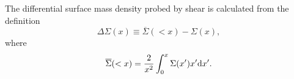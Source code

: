 \documentclass{emulateapj}
\newcommand{\attn}[2][red]{\textcolor{#1}{\textit{#2}}}
\begin{document}
The differential surface mass density probed by shear is calculated from the definition
\begin{equation}\label{dsigma}
\Delta\Sigma(x) \equiv  \overline{\Sigma}(<x) - \Sigma(x),
\end{equation}
where
\begin{equation}\label{sigbar}
\overline{\Sigma}(<x) = \frac{2}{x^2} \int_0^{x} \Sigma(x') x' {\rm d}x'.
\end{equation}

\end{document}

